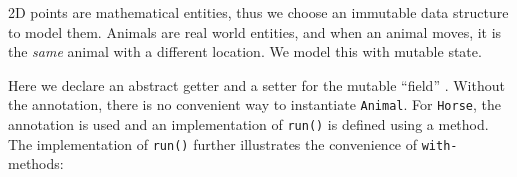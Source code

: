 %

%
%

2D points are mathematical entities, thus we choose an immutable data structure to
model them. Animals are real world entities, and when an animal moves,
it is the \emph{same} animal with a different location. We model this with
mutable state.


\noindent Here we declare an abstract getter and a setter for the mutable ``field''
\Q@location@.  Without the \mixin annotation, there is no convenient way to
instantiate \texttt{Animal}.  For \texttt{Horse}, the \mixin annotation is used
and an implementation of \texttt{run()} is defined using a \Q@default@
method. The implementation of \texttt{run()} further illustrates the convenience of \texttt{with-} methods:

